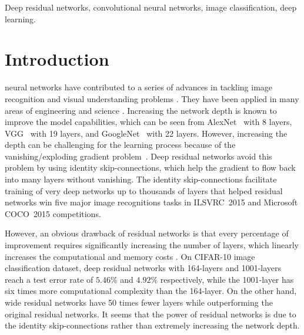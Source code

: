 \documentclass[journal]{IEEEtran}
\begin{document}
\begin{IEEEkeywords}
Deep residual networks, convolutional neural networks, image classification, deep learning.
\end{IEEEkeywords}






\IEEEpeerreviewmaketitle



\section{Introduction}
  neural networks \cite{lecun1989backpropagation} have contributed to a series of advances in tackling image recognition and visual understanding problems \cite{krizhevsky2012imagenet,sermanet2013overfeat,zeiler2014visualizing}. They have been applied in many areas of engineering and science \cite{wallach2015atomnet,mohan2014deep,kim2014convolutional}. Increasing the network depth is known to improve the model capabilities, which can be seen from AlexNet~\cite{krizhevsky2012imagenet} with 8 layers, VGG~\cite{simonyan2014very} with 19 layers, and GoogleNet~\cite{szegedy2015going} with 22 layers. However, increasing the depth can be challenging for the learning process because of the vanishing/exploding gradient problem~\cite{hochreiter1991untersuchungen,bengio1994learning}. Deep residual networks \cite{he2015deep} avoid this problem by using identity skip-connections, which help the gradient to flow back into many layers without vanishing. The identity skip-connections facilitate training of very deep networks up to thousands of layers that helped residual networks win five major image recognitions tasks in ILSVRC~2015 \cite{ILSVRC15} and Microsoft COCO~2015 \cite{lin2014microsoft} competitions.

However, an obvious drawback of residual networks is that every percentage of improvement requires significantly increasing the number of layers, which linearly increases the computational and memory costs \cite{he2015deep}. On CIFAR-10 image classification dataset, deep residual networks with 164-layers and 1001-layers reach a test error rate of $5.46\%$ and $4.92\%$ respectively, while the 1001-layer has six times more computational complexity than the 164-layer. On the other hand, wide residual networks \cite{zagoruyko2016wide} have 50 times fewer layers while outperforming the original residual networks. It seems that the power of residual networks is due to the identity skip-connections rather than extremely increasing the network depth.
\end{document}
